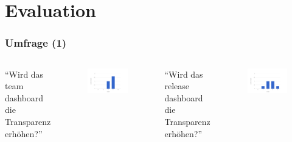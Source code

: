 \documentclass{beamer}
\begin{document}
\section{Evaluation}

\begin{frame}
\frametitle{Umfrage (1)}
\begin{columns}
   ``Wird das team dashboard die Transparenz erh\"ohen?''
   \begin{figure}[h!]
    \centering
    \includegraphics[scale=0.3,keepaspectratio=true]{./halo2a.png}
   \end{figure}
   ``Wird das release dashboard die Transparenz erh\"ohen?''
   \begin{figure}[h!]
    \centering
    \includegraphics[scale=0.3,keepaspectratio=true]{./halo2d.png}
   \end{figure}
\end{columns}
\end{frame}
\end{document}
